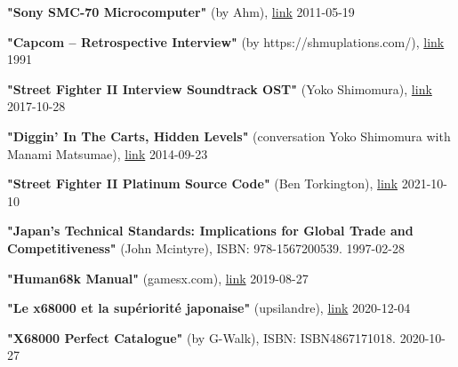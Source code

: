 \begin{thebibliography}{999}
  \textbf{"Sony SMC-70 Microcomputer"} (by Ahm),
  \href{http://users.glitchwrks.com/~ahm/smc70/}{link}
  2011-05-19

  \textbf{"Capcom – Retrospective Interview"} (by https://shmuplations.com/),
  \href{https://shmuplations.com/capcom1991/}{link}
  1991


  \textbf{"Street Fighter II Interview Soundtrack OST"} (Yoko Shimomura),
  \href{https://www.youtube.com/watch?v=HOxN8Dzv2sw}{link}
  2017-10-28
  
  \textbf{"Diggin' In The Carts, Hidden Levels"} (conversation Yoko Shimomura with Manami Matsumae),
  \href{https://www.youtube.com/watch?v=Y__usQbGA5M}{link}
  2014-09-23

  \textbf{"Street Fighter II Platinum Source Code"} (Ben Torkington),
  \href{https://github.com/bentorkington/sf2ww}{link}
  2021-10-10

  \textbf{"Japan's Technical Standards: Implications for Global Trade and Competitiveness"} (John Mcintyre),
  ISBN: 978-1567200539.
  1997-02-28

  \textbf{"Human68k Manual"} (gamesx.com),
\href{https://gamesx.com/wiki/doku.php?id=x68000:human68k_manual}{link}
  2019-08-27

  \textbf{"Le x68000 et la supériorité japonaise"} (upsilandre),
\href{https://www.gamopat-forum.com/t38282p210-le-x68000-et-la-superiorite-japonaise#3336620}{link}
  2020-12-04

  \textbf{"X68000 Perfect Catalogue"} (by G-Walk),
ISBN: ISBN4867171018.
  2020-10-27

\end{thebibliography}
